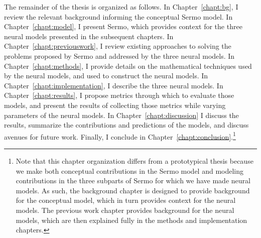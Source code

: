 The remainder of the thesis is organized as follows.
In Chapter~\ref{chapt:bg},
I review the relevant background informing
the conceptual Sermo model.
In Chapter~\ref{chapt:model},
I present Sermo,
which provides context for
the three neural models presented
in the subsequent chapters.
In Chapter~\ref{chapt:previouswork},
I review existing approaches
to solving the problems
proposed by Sermo
and addressed by the three neural models.
In Chapter~\ref{chapt:methods},
I provide details on the
mathematical techniques
used by the neural models,
and used to construct the neural models.
In Chapter~\ref{chapt:implementation},
I describe the three neural models.
In Chapter~\ref{chapt:results},
I propose metrics through which
to evaluate those models,
and present the results of collecting those metrics
while varying parameters of the neural models.
In Chapter~\ref{chapt:discussion}
I discuss the results,
summarize the contributions and predictions
of the models,
and discuss avenues for future work.
Finally, I conclude in Chapter~\ref{chapt:conclusion}.\footnote{
  Note that this chapter organization differs
  from a prototypical thesis
  because we make both
  conceptual contributions
  in the Sermo model
  and modeling contributions
  in the three subparts of Sermo
  for which we have made neural models.
  As such, the background chapter is designed
  to provide background for the conceptual model,
  which in turn provides context
  for the neural models.
  The previous work chapter provides
  background for the neural models,
  which are then explained fully
  in the methods and implementation chapters.}
